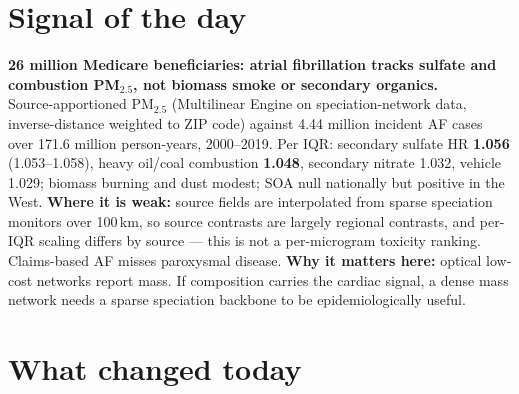 \documentclass[10pt]{article}
\begin{document}
\vspace{6mm}

\section*{\sffamily\bfseries\color{Deep}Signal of the day}
\vspace{-1.5mm}{\color{Amber}\rule{\linewidth}{1.1pt}}\vspace{2.5mm}

\begin{keybox}
{\sffamily\bfseries\small\color{Deep}26 million Medicare beneficiaries: atrial fibrillation tracks sulfate and
combustion PM$_{2.5}$, not biomass smoke or secondary organics.}\\[1.4mm]
\footnotesize
Source-apportioned PM$_{2.5}$ (Multilinear Engine on speciation-network data, inverse-distance weighted to ZIP code)
against 4.44 million incident AF cases over 171.6 million person-years, 2000--2019. Per IQR: secondary sulfate HR
\textbf{1.056} (1.053--1.058), heavy oil/coal combustion \textbf{1.048}, secondary nitrate 1.032, vehicle 1.029;
biomass burning and dust modest; SOA null nationally but positive in the West.
\textbf{Where it is weak:} source fields are interpolated from sparse speciation monitors over 100\,km, so source
contrasts are largely regional contrasts, and per-IQR scaling differs by source --- this is not a per-microgram
toxicity ranking. Claims-based AF misses paroxysmal disease.
\textbf{Why it matters here:} optical low-cost networks report mass. If composition carries the cardiac signal,
a dense mass network needs a sparse speciation backbone to be epidemiologically useful.\par
\end{keybox}

\vspace{3mm}

\section*{\sffamily\bfseries\color{Deep}What changed today}
\vspace{-1.5mm}{\color{Amber}\rule{\linewidth}{1.1pt}}\vspace{2.5mm}
\end{document}
